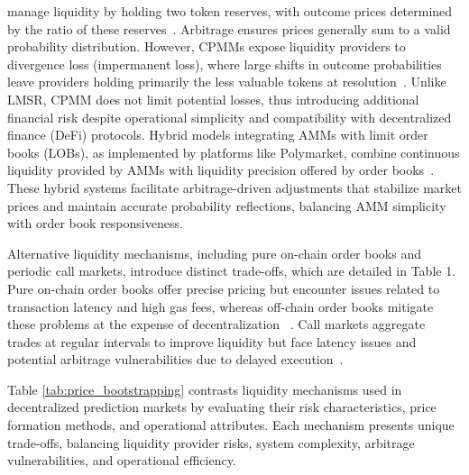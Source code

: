 {manage liquidity by holding two token reserves, with outcome prices determined by the ratio of these reserves~\cite{AC20}. Arbitrage ensures prices generally sum to a valid probability distribution. However, CPMMs expose liquidity providers to divergence loss (impermanent loss), where large shifts in outcome probabilities leave providers holding primarily the less valuable tokens at resolution~\cite{CDM23}. Unlike LMSR, CPMM does not limit potential losses, thus introducing additional financial risk despite operational simplicity and compatibility with decentralized finance (DeFi) protocols.
Hybrid models integrating AMMs with limit order books (LOBs), as implemented by platforms like Polymarket, combine continuous liquidity provided by AMMs with liquidity precision offered by order books~\cite{ClEsGS21}. These hybrid systems facilitate arbitrage-driven adjustments that stabilize market prices and maintain accurate probability reflections, balancing AMM simplicity with order book responsiveness.

Alternative liquidity mechanisms, including pure on-chain order books and periodic call markets, introduce distinct trade-offs, which are detailed in Table 1. Pure on-chain order books offer precise pricing but encounter issues related to transaction latency and high gas fees, whereas off-chain order books mitigate these problems at the expense of decentralization ~\cite{BCFKMN14}. Call markets aggregate trades at regular intervals to improve liquidity but face latency issues and potential arbitrage vulnerabilities due to delayed execution~\cite{ACES17}.

Table \ref{tab:price_bootstrapping} contrasts liquidity mechanisms used in decentralized prediction markets by evaluating their risk characteristics, price formation methods, and operational attributes. Each mechanism presents unique trade-offs, balancing liquidity provider risks, system complexity, arbitrage vulnerabilities, and operational efficiency.

}

